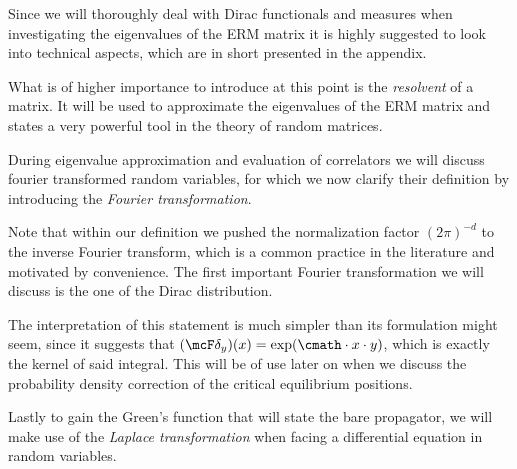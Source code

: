 Since we will thoroughly deal with Dirac functionals and measures when investigating the eigenvalues of the ERM matrix it is highly suggested to look into technical aspects, which are in short presented in the appendix. 

What is of higher importance to introduce at this point is the \emph{resolvent} of a matrix. It will be used to approximate the eigenvalues of the ERM matrix and states a very powerful tool in the theory of random matrices.

During eigenvalue approximation and evaluation of correlators we will discuss fourier transformed random variables, for which we now clarify their definition by introducing the \emph{Fourier transformation}.

Note that within our definition we pushed the normalization factor $(2\pi)^{-d}$ to the inverse Fourier transform, which is a common practice in the literature \cite{paper:Grigera_2011} and motivated by convenience. The first important Fourier transformation we will discuss is the one of the Dirac distribution.

The interpretation of this statement is much simpler than its formulation might seem, since it suggests that $(\mcF\delta_y)(x) = \exp(\cmath\cdot x\cdot y)$, which is exactly the kernel of said integral. This will be of use later on when we discuss the probability density correction of the critical equilibrium positions. 

Lastly to gain the Green's function that will state the bare propagator, we will make use of the \emph{Laplace transformation} when facing a differential equation in random variables.


